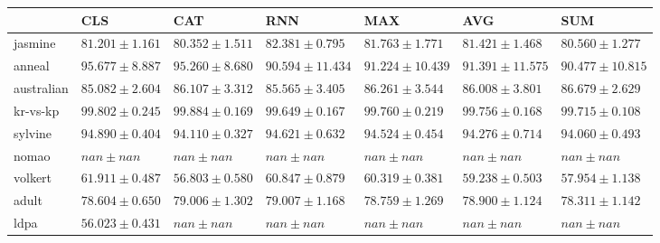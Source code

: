 \begin{tabular}{lllllll}
\toprule
 & CLS & CAT & RNN & MAX & AVG & SUM \\
\midrule
jasmine & $81.201 \pm 1.161$ & $80.352 \pm 1.511$ & $82.381 \pm 0.795$ & $81.763 \pm 1.771$ & $81.421 \pm 1.468$ & $80.560 \pm 1.277$ \\
anneal & $95.677 \pm 8.887$ & $95.260 \pm 8.680$ & $90.594 \pm 11.434$ & $91.224 \pm 10.439$ & $91.391 \pm 11.575$ & $90.477 \pm 10.815$ \\
australian & $85.082 \pm 2.604$ & $86.107 \pm 3.312$ & $85.565 \pm 3.405$ & $86.261 \pm 3.544$ & $86.008 \pm 3.801$ & $86.679 \pm 2.629$ \\
kr-vs-kp & $99.802 \pm 0.245$ & $99.884 \pm 0.169$ & $99.649 \pm 0.167$ & $99.760 \pm 0.219$ & $99.756 \pm 0.168$ & $99.715 \pm 0.108$ \\
sylvine & $94.890 \pm 0.404$ & $94.110 \pm 0.327$ & $94.621 \pm 0.632$ & $94.524 \pm 0.454$ & $94.276 \pm 0.714$ & $94.060 \pm 0.493$ \\
nomao & $nan \pm nan$ & $nan \pm nan$ & $nan \pm nan$ & $nan \pm nan$ & $nan \pm nan$ & $nan \pm nan$ \\
volkert & $61.911 \pm 0.487$ & $56.803 \pm 0.580$ & $60.847 \pm 0.879$ & $60.319 \pm 0.381$ & $59.238 \pm 0.503$ & $57.954 \pm 1.138$ \\
adult & $78.604 \pm 0.650$ & $79.006 \pm 1.302$ & $79.007 \pm 1.168$ & $78.759 \pm 1.269$ & $78.900 \pm 1.124$ & $78.311 \pm 1.142$ \\
ldpa & $56.023 \pm 0.431$ & $nan \pm nan$ & $nan \pm nan$ & $nan \pm nan$ & $nan \pm nan$ & $nan \pm nan$ \\
\bottomrule
\end{tabular}
